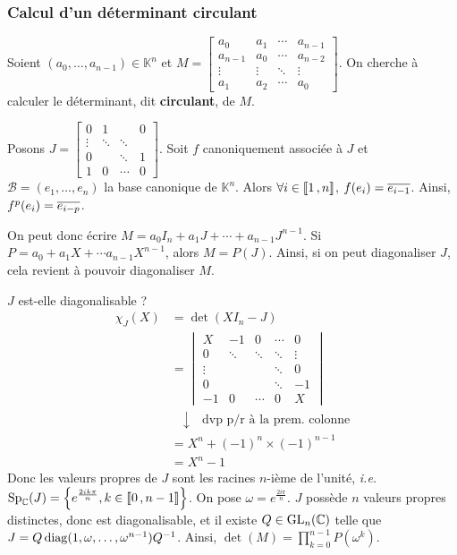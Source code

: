     \subsubsection{Calcul d’un déterminant circulant}

    Soient $(a_0, \ldots, a_{n-1}) \in \mathbb{K}^n$ et $M = \begin{bmatrix}
        a_0 & a_1 & \cdots & a_{n-1} \\
        a_{n-1} & a_0 & \cdots & a_{n-2} \\
        \vdots & \vdots & \ddots & \vdots \\
        a_1 & a_2 & \cdots & a_0
    \end{bmatrix}$. On cherche à calculer le déterminant, dit \textbf{circulant}, de $M$.

    Posons $J = \begin{bmatrix}
        0 & 1 & & 0 \\
        \vdots & \ddots & \ddots & \\
        0 & & \ddots & 1 \\
        1 & 0 & \cdots & 0
    \end{bmatrix}$. Soit $f$ canoniquement associée à $J$ et $\mathcal{B} = (e_1,\ldots, e_n)$ la base canonique de $\mathbb{K}^n$. Alors $\forall i \in \left\llbracket 1 \, , n \right\rrbracket$, $f(e_i) = \overline{e_{i-1}}$. Ainsi, $f^p(e_i) = \overline{e_{i - p}}$. 

    On peut donc écrire $M = a_0 I_n + a_1 J + \cdots + a_{n-1} J^{n-1}$. Si $P = a_0 + a_1 X + \cdots a_{n-1} X^{n-1}$, alors $M = P(J)$. Ainsi, si on peut diagonaliser $J$, cela revient à pouvoir diagonaliser $M$.

    $J$ est-elle diagonalisable ?
    \begin{align*}
        \chi_J(X) 
        &= \det(X I_n - J) \\
        &= \begin{vmatrix}
            X & - 1 & 0 & \cdots & 0 \\
            0 & \ddots & \ddots & \ddots & \vdots \\
            \vdots & & & \ddots & 0 \\
            0 & & & \ddots & -1 \\
            -1 & 0 & \cdots & 0 & X
        \end{vmatrix} \\
        &\quad \downarrow \quad \text{dvp p/r à la prem. colonne} \\
        &= X^n + (-1)^n \times (-1)^{n-1} \\
        &= X^n - 1
    \end{align*}
    Donc les valeurs propres de $J$ sont les racines $n$-ième de l’unité, \textit{i.e.} $\operatorname{Sp}_{\mathbb{C}}(J) = \left\{e^{\frac{2ik\pi}{n}}, k \in \left\llbracket 0 \, , n-1 \right\rrbracket\right\}$. On pose $\omega = e^{\frac{2i\pi}{n}}$. $J$ possède $n$ valeurs propres distinctes, donc est diagonalisable, et il existe $Q \in \operatorname{GL}_n(\mathbb{C})$ telle que $J = Q \operatorname{diag}(1,\omega, \ldots, \omega^{n-1}) Q^{-1}$. Ainsi, $\det(M) = \prod_{k=0}^{n-1} P(\omega^k)$.


